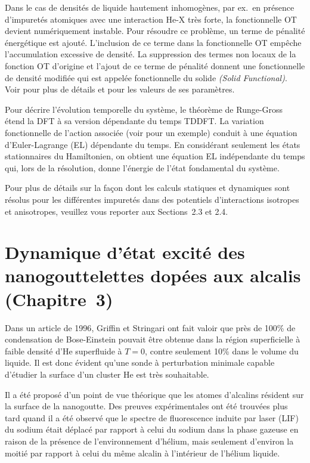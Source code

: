 		Dans le cas de densités de liquide hautement inhomogènes, par ex.\ en présence d'impuretés atomiques avec une interaction He-X très forte, la fonctionnelle OT devient numériquement instable. 
		Pour résoudre ce problème, un terme de pénalité énergétique  est ajouté.
		 L'inclusion de ce terme dans la fonctionnelle OT empêche l'accumulation excessive de densité. 
		 La suppression des termes non locaux de la fonction OT d'origine et l'ajout de ce terme de pénalité donnent une fonctionnelle de densité modifiée qui est appelée fonctionnelle du solide \emph{(Solid Functional)}. 
		 Voir  pour plus de détails et pour les valeurs de ses paramètres.
		
		Pour décrire l'évolution temporelle du système, le théorème de Runge-Gross étend la DFT à sa version dépendante du temps TDDFT\citep{Run84}. 
		La variation fonctionnelle de l'action associée (voir  pour un exemple) conduit à une équation d'Euler-Lagrange (EL) dépendante du temps. 
		En considérant seulement les états stationnaires du Hamiltonien, on obtient une équation EL indépendante du temps qui, lors de la résolution, donne l'énergie de l'état fondamental du système.
		
		Pour plus de détails sur la façon dont les calculs statiques et dynamiques sont résolus pour les différentes impuretés dans des potentiels d'interactions isotropes et anisotropes, veuillez vous reporter aux Sections~2.3 et 2.4.
		
	\section*{Dynamique d'état excité des nanogouttelettes dopées aux alcalis \small{(Chapitre~3)}}
		Dans un article de 1996\citep{Griffin1996}, Griffin et Stringari ont fait valoir que près de 100\% de condensation de Bose-Einstein pouvait être obtenue dans la région superficielle à faible densité d'He superfluide à $T=0$, contre seulement 10\% dans le volume du liquide. 
		Il est donc évident qu'une sonde à perturbation minimale capable d'étudier la surface d'un cluster He est très souhaitable.
		
		Il a été proposé d'un point de vue théorique\citep{Dalfovo1994} que les atomes d'alcalins résident sur la surface de la nanogoutte. 
		Des preuves expérimentales ont été trouvées \citep{Stienkemeier1995-1,Stienkemeier1995-2,Ancilotto1995-1} plus tard quand il a été observé que le spectre de fluorescence induite par laser (LIF) du sodium était déplacé par rapport à celui du sodium dans la phase gazeuse en raison de la présence de l'environnement d'hélium,  mais seulement d'environ la moitié par rapport à celui du même alcalin à l'intérieur de l'hélium liquide.
		
